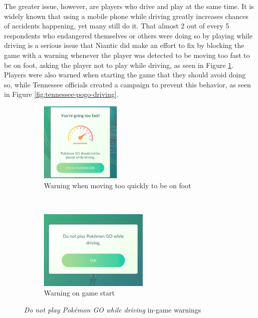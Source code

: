 The greater issue, however, are players who drive and play at the same time. It is widely known \cite{WHOphonedriving} that using a mobile phone while driving greatly increases chances of accidents happening, yet many still do it. That almost 2 out of every 5 respondents who endangered themselves or others were doing so by playing while driving is a serious issue that Niantic did make an effort to fix by blocking the game with a warning whenever the player was detected to be moving too fast to be on foot, asking the player not to play while driving, as seen in Figure \ref{fig:do-not-play-and-drive}. Players were also warned when starting the game that they should avoid doing so, while Tennessee officials created a campaign to prevent this behavior, as seen in Figure \ref{fig:tennessee-pogo-driving}.

\begin{figure}[h]
	\centering
	\begin{subfigure}[t]{0.45\textwidth}
		\centering
		\includegraphics[height=1.5in]{Figures/pogo-warning-driving}
		\caption{Warning when moving too quickly to be on foot}
	\end{subfigure}
	~
	\begin{subfigure}[t]{0.45\textwidth}
		\centering
		\includegraphics[height=1.5in]{Figures/pogo-warning-startup-driving}
		\caption{Warning on game start}
	\end{subfigure}
	\caption{\emph{Do not play Pokémon GO while driving} in-game warnings}
	\label{fig:do-not-play-and-drive}
\end{figure}

